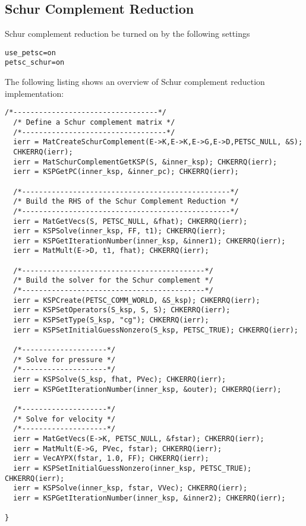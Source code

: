 \documentclass[10pt,letterpaper]{article}
\begin{document}
\subsection{Schur Complement Reduction}
Schur complement reduction be turned on by the following settings
\begin{lstlisting}
use_petsc=on
petsc_schur=on
\end{lstlisting}

The following listing shows an overview of Schur complement reduction implementation:
\begin{lstlisting}[frame=tb,mathescape,caption=Schur Complement Reduction]
  /*----------------------------------*/
  /* Define a Schur complement matrix */
  /*----------------------------------*/
  ierr = MatCreateSchurComplement(E->K,E->K,E->G,E->D,PETSC_NULL, &S); 
  CHKERRQ(ierr);
  ierr = MatSchurComplementGetKSP(S, &inner_ksp); CHKERRQ(ierr);
  ierr = KSPGetPC(inner_ksp, &inner_pc); CHKERRQ(ierr);

  /*-------------------------------------------------*/
  /* Build the RHS of the Schur Complement Reduction */
  /*-------------------------------------------------*/
  ierr = MatGetVecs(S, PETSC_NULL, &fhat); CHKERRQ(ierr);
  ierr = KSPSolve(inner_ksp, FF, t1); CHKERRQ(ierr);
  ierr = KSPGetIterationNumber(inner_ksp, &inner1); CHKERRQ(ierr);
  ierr = MatMult(E->D, t1, fhat); CHKERRQ(ierr);

  /*-------------------------------------------*/
  /* Build the solver for the Schur complement */
  /*-------------------------------------------*/
  ierr = KSPCreate(PETSC_COMM_WORLD, &S_ksp); CHKERRQ(ierr);
  ierr = KSPSetOperators(S_ksp, S, S); CHKERRQ(ierr);
  ierr = KSPSetType(S_ksp, "cg"); CHKERRQ(ierr);
  ierr = KSPSetInitialGuessNonzero(S_ksp, PETSC_TRUE); CHKERRQ(ierr);

  /*--------------------*/
  /* Solve for pressure */
  /*--------------------*/
  ierr = KSPSolve(S_ksp, fhat, PVec); CHKERRQ(ierr);
  ierr = KSPGetIterationNumber(inner_ksp, &outer); CHKERRQ(ierr);

  /*--------------------*/
  /* Solve for velocity */
  /*--------------------*/
  ierr = MatGetVecs(E->K, PETSC_NULL, &fstar); CHKERRQ(ierr);
  ierr = MatMult(E->G, PVec, fstar); CHKERRQ(ierr);
  ierr = VecAYPX(fstar, 1.0, FF); CHKERRQ(ierr);
  ierr = KSPSetInitialGuessNonzero(inner_ksp, PETSC_TRUE); CHKERRQ(ierr);
  ierr = KSPSolve(inner_ksp, fstar, VVec); CHKERRQ(ierr);
  ierr = KSPGetIterationNumber(inner_ksp, &inner2); CHKERRQ(ierr);

}
\end{lstlisting}
\end{document}
